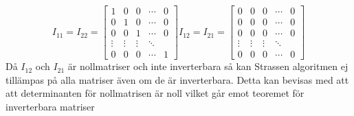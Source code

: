   $$ I_{11}=I_{22} =
 \begin{bmatrix}
   1 & 0 & 0 & \cdots & 0 \\
  0 & 1 & 0 & \cdots & 0 \\
  0 & 0 & 1 & \cdots & 0 \\
  \vdots  & \vdots  & \vdots & \ddots  \\
  0 & 0 & 0 & \cdots & 1
 \end{bmatrix}
 I_{12}=I_{21}=
  \begin{bmatrix}
   0 & 0 & 0 & \cdots & 0 \\
  0 & 0 & 0 & \cdots & 0 \\
  0 & 0 & 0 & \cdots & 0 \\
  \vdots  & \vdots  & \vdots & \ddots  \\
  0 & 0 & 0 & \cdots & 0
 \end{bmatrix}
 $$
 Då $I_{12}$ och $I_{21}$ är nollmatriser och inte inverterbara så kan Strassen algoritmen ej tillämpas på alla matriser även om de är inverterbara. Detta kan bevisas med att att determinanten för nollmatrisen är noll vilket går emot teoremet för inverterbara matriser \citep{Setyadi} 
 
